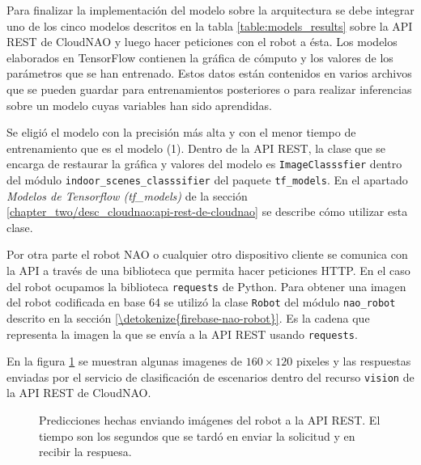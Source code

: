 Para finalizar la implementación del modelo sobre la arquitectura
se debe integrar uno de los cinco modelos descritos en la tabla \ref{table:models_results} sobre la API REST de CloudNAO y luego hacer peticiones con el robot a ésta.
Los modelos elaborados en TensorFlow contienen la gráfica de cómputo
y los valores de los parámetros que se han entrenado. Estos datos
están contenidos en varios archivos que se pueden guardar para
entrenamientos posteriores o para realizar inferencias sobre 
un modelo cuyas variables han sido aprendidas.

Se eligió el modelo con la precisión más alta y con el menor
tiempo de entrenamiento que es el modelo (1). 
Dentro de la API REST, la clase que se encarga de restaurar la gráfica y valores del modelo
es \texttt{ImageClasssfier} dentro del módulo \texttt{indoor\_scenes\_classsifier} del paquete \texttt{tf\_models}.
En el apartado \textit{Modelos de Tensorflow (tf\_models)}
de la sección \ref{chapter_two/desc_cloudnao:api-rest-de-cloudnao}
se describe cómo utilizar esta clase.

Por otra parte el robot NAO o cualquier otro
dispositivo cliente se comunica con la API a través
de una biblioteca que permita hacer peticiones 
HTTP. En el caso del robot ocupamos la biblioteca
\texttt{requests} de Python. Para obtener una imagen 
del robot codificada en base 64 se utilizó la clase \texttt{Robot}
del módulo \texttt{nao\_robot} descrito en la sección
\ref{\detokenize{firebase-nao-robot}}. Es la cadena
que representa la imagen la que se envía a la API REST usando
\texttt{requests}.

En la figura \ref{nao_api_images} se muestran algunas imagenes 
de $160 \times 120$ pixeles y las
respuestas enviadas por el servicio de clasificación
de escenarios dentro del recurso \texttt{vision} de la
API REST de CloudNAO.


\begin{figure}[!ht] 
  \centering
  
\qquad
{}
\qquad
{}
\qquad
{}
\caption{Predicciones hechas enviando imágenes del robot a la API REST. El tiempo son los
segundos que se tardó en enviar la solicitud y en recibir la respuesa. \label{nao_api_images}}
\end{figure}







 

